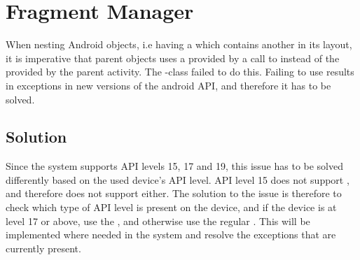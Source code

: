 \section{Fragment Manager}
\label{sec:fragment_manager}

When nesting Android  objects, i.e having a  which contains another  in its layout, it is imperative that parent  objects uses a  provided by a call to  instead of the  provided by the parent activity. The \giraf-class  failed to do this. Failing to use  results in exceptions in new versions of the android API, and therefore it has to be solved. 

\subsection{Solution} 
\label{sub:fragment_manager_solution}
Since the \giraf system supports API levels 15, 17 and 19, this issue has to be solved differently based on the used device's API level. API level 15 does not support , and therefore does not support  either. The solution to the issue is therefore to check which type of API level is present on the device, and if the device is at level 17 or above, use the , and otherwise use the regular . This will be implemented where needed in the \giraf system and resolve the exceptions that are currently present. 